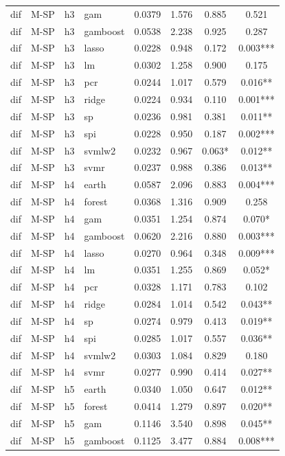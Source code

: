 \begin{ThreePartTable}
\begin{longtable}[t]{llclcccc}
dif & M-SP & h3 & gam & 0.0379 & 1.576 & 0.885 & 0.521\\
dif & M-SP & h3 & gamboost & 0.0538 & 2.238 & 0.925 & 0.287\\
dif & M-SP & h3 & lasso & 0.0228 & 0.948 & 0.172 & 0.003***\\
dif & M-SP & h3 & lm & 0.0302 & 1.258 & 0.900 & 0.175\\
dif & M-SP & h3 & pcr & 0.0244 & 1.017 & 0.579 & 0.016**\\
dif & M-SP & h3 & ridge & 0.0224 & 0.934 & 0.110 & 0.001***\\
dif & M-SP & h3 & sp & 0.0236 & 0.981 & 0.381 & 0.011**\\
dif & M-SP & h3 & spi & 0.0228 & 0.950 & 0.187 & 0.002***\\
dif & M-SP & h3 & svmlw2 & 0.0232 & 0.967 & 0.063* & 0.012**\\
dif & M-SP & h3 & svmr & 0.0237 & 0.988 & 0.386 & 0.013**\\
\addlinespace
dif & M-SP & h4 & earth & 0.0587 & 2.096 & 0.883 & 0.004***\\
dif & M-SP & h4 & forest & 0.0368 & 1.316 & 0.909 & 0.258\\
dif & M-SP & h4 & gam & 0.0351 & 1.254 & 0.874 & 0.070*\\
dif & M-SP & h4 & gamboost & 0.0620 & 2.216 & 0.880 & 0.003***\\
dif & M-SP & h4 & lasso & 0.0270 & 0.964 & 0.348 & 0.009***\\
dif & M-SP & h4 & lm & 0.0351 & 1.255 & 0.869 & 0.052*\\
dif & M-SP & h4 & pcr & 0.0328 & 1.171 & 0.783 & 0.102\\
dif & M-SP & h4 & ridge & 0.0284 & 1.014 & 0.542 & 0.043**\\
dif & M-SP & h4 & sp & 0.0274 & 0.979 & 0.413 & 0.019**\\
dif & M-SP & h4 & spi & 0.0285 & 1.017 & 0.557 & 0.036**\\
dif & M-SP & h4 & svmlw2 & 0.0303 & 1.084 & 0.829 & 0.180\\
dif & M-SP & h4 & svmr & 0.0277 & 0.990 & 0.414 & 0.027**\\
\addlinespace
dif & M-SP & h5 & earth & 0.0340 & 1.050 & 0.647 & 0.012**\\
dif & M-SP & h5 & forest & 0.0414 & 1.279 & 0.897 & 0.020**\\
dif & M-SP & h5 & gam & 0.1146 & 3.540 & 0.898 & 0.045**\\
dif & M-SP & h5 & gamboost & 0.1125 & 3.477 & 0.884 & 0.008***\\

\end{longtable}
\end{ThreePartTable}

